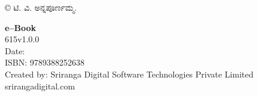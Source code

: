 \thispagestyle{empty}

© ಟಿ. ವಿ. ಅನ್ನಪೂರ್ಣಮ್ಮ.

 \textbf{e–Book}\\
 615v1.0.0\\
 Date:\\
 ISBN: 9789388252638\\
 Created by: Sriranga Digital Software Technologies Private Limited\\srirangadigital.com


